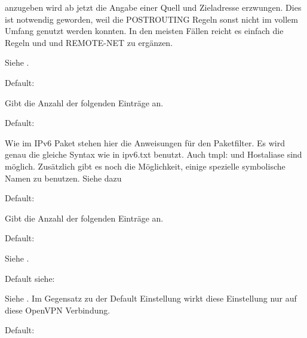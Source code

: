 \begin{description}
  anzugeben wird ab jetzt die Angabe einer Quell und Zieladresse
  erzwungen. Dies ist notwendig geworden, weil die POSTROUTING Regeln
  sonst nicht im vollem Umfang genutzt werden konnten. In den meisten
  Fällen reicht es einfach die Regeln und  und REMOTE-NET zu
  ergänzen.

  Siehe .


  Default: 

  Gibt die Anzahl der folgenden 
  Einträge an.


  Default: 

  Wie im IPv6 Paket stehen hier die Anweisungen für den
  Paketfilter. Es wird genau die gleiche Syntax wie in ipv6.txt
  benutzt. Auch tmpl: und Hostaliase sind möglich. Zusätzlich gibt es
  noch die Möglichkeit, einige spezielle symbolische Namen zu
  benutzen. Siehe dazu   


  Default: 

  Gibt die Anzahl der folgenden 
  Einträge an.


  Default: 

  Siehe .


  Default siehe: 

  Siehe . Im
  Gegensatz zu der Default Einstellung wirkt diese Einstellung nur auf
  diese OpenVPN Verbindung.


  Default: 


\end{description}
